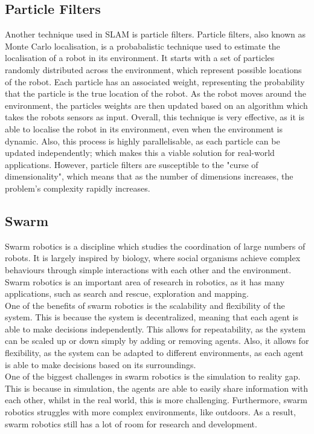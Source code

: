 \documentclass[12pt]{article}
\begin{document}
\subsection{Particle Filters}
Another technique used in SLAM is particle filters. Particle filters, also known as Monte Carlo localisation, is a probabalistic
technique used to estimate the localisation of a robot in its environment. It starts with a set of particles randomly distributed
across the environment, which represent possible locations of the robot. Each particle has an associated weight, representing the
probability that the particle is the true location of the robot. As the robot moves around the environment, the particles weights
are then updated based on an algorithm which takes the robots sensors as input. Overall, this technique is very effective, as it
is able to localise the robot in its environment, even when the environment is dynamic. Also, this process is highly parallelisable,
as each particle can be updated independently; which makes this a viable solution for real-world applications. However, particle
filters are susceptible to the "curse of dimensionality", which means that as the number of dimensions increases, the problem's
complexity rapidly increases.

\subsection{Swarm}
Swarm robotics is a discipline which studies the coordination of large numbers of robots. It is largely inspired by biology,
where social organisms achieve complex behaviours through simple interactions with each other and the environment. Swarm
robotics is an important area of research in robotics, as it has many applications, such as search and rescue, exploration
and mapping.\\
One of the benefits of swarm robotics is the scalability and flexibility of the system. This is because the system is
decentralized, meaning that each agent is able to make decisions independently. This allows for repeatability, as the system
can be scaled up or down simply by adding or removing agents. Also, it allows for flexibility, as the system can be adapted
to different environments, as each agent is able to make decisions based on its surroundings.\\
One of the biggest challenges in swarm robotics is the simulation to reality gap. This is because in simulation, the agents
are able to easily share information with each other, whilst in the real world, this is more challenging. Furthermore, swarm
robotics struggles with more complex environments, like outdoors. As a result, swarm robotics still has a lot of room for
research and development.
\end{document}
